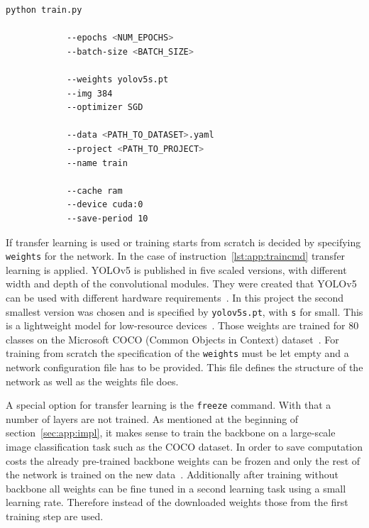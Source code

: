 \renewcommand{\lstlistingname}{Instruction}
\begin{minipage}{\linewidth}
	\vspace*{0.5cm}
	\begin{lstlisting}[language=Bash, keywordstyle=\color{black}, 
		caption=General command to start the training of YOLOv5., label=lst:app:traincmd]
		python train.py
		
			--epochs <NUM_EPOCHS>
			--batch-size <BATCH_SIZE>
			
			--weights yolov5s.pt
			--img 384
			--optimizer SGD
			
			--data <PATH_TO_DATASET>.yaml
			--project <PATH_TO_PROJECT>
			--name train
			
			--cache ram
			--device cuda:0
			--save-period 10
	\end{lstlisting}
\end{minipage}

If transfer learning is used or training starts from scratch is decided by specifying \texttt{weights} 
for the network. In the case of instruction~\ref{lst:app:traincmd} transfer learning is applied. YOLOv5 
is published in five scaled versions, with different width and depth of the convolutional modules. 
They were created that YOLOv5 can be used with different hardware 
requirements~\cite{jocher2020, terven2023}. In this project the second smallest version was chosen 
and is specified by \texttt{yolov5s.pt}, with \texttt{s} for small. This is a lightweight model for 
low-resource devices~\cite{terven2023}. Those weights are trained for 80 classes on the Microsoft 
COCO (Common Objects in Context) dataset~\cite{lin2014, jocher2020}. For training from scratch 
the specification of the \texttt{weights} must be let empty and a network configuration file has to be 
provided. This file defines the structure of the network as well as the weights file does.

A special option for transfer learning is the \texttt{freeze} command. With that a number of 
layers are not trained. As mentioned at the beginning of section~\ref{sec:app:impl}, it makes sense 
to train the backbone on a large-scale image classification task such as the COCO dataset. In order 
to save computation costs the already pre-trained backbone weights can be frozen and only the rest 
of the network is trained on the new data~\cite{y5TransfLearn}. Additionally after training without 
backbone all weights can be fine tuned in a second learning task using a small learning rate. 
Therefore instead of the downloaded weights those from the first training step are used.

